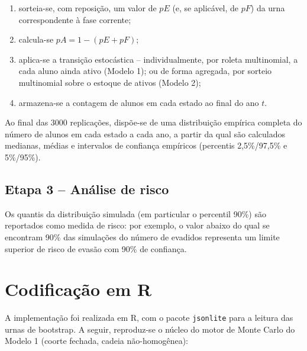 \documentclass[12pt,times,article,chapter=TITLE]{abnt}
\begin{document}
\begin{enumerate}
  \item sorteia-se, com reposição, um valor de $pE$ (e, se aplicável, de $pF$) da urna correspondente à fase corrente;
  \item calcula-se $pA = 1 - (pE+pF)$;
  \item aplica-se a transição estocástica -- individualmente, por roleta multinomial, a cada aluno ainda ativo (Modelo 1); ou de forma agregada, por sorteio multinomial sobre o estoque de ativos (Modelo 2);
  \item armazena-se a contagem de alunos em cada estado ao final do ano $t$.
\end{enumerate}

Ao final das $3000$ replicações, dispõe-se de uma distribuição empírica completa do número de alunos em cada estado a cada ano, a partir da qual são calculados medianas, médias e intervalos de confiança empíricos (percentis 2,5\%/97,5\% e 5\%/95\%).

\section{Etapa 3 -- Análise de risco}

Os quantis da distribuição simulada (em particular o percentil 90\%) são reportados como medida de risco: por exemplo, o valor abaixo do qual se encontram 90\% das simulações do número de evadidos representa um limite superior de risco de evasão com 90\% de confiança.


\chapter{Codificação em R}
\label{sec:codigo}

A implementação foi realizada em R, com o pacote \texttt{jsonlite} para a leitura das urnas de bootstrap. A seguir, reproduz-se o núcleo do motor de Monte Carlo do Modelo 1 (coorte fechada, cadeia não-homogênea):
\end{document}
